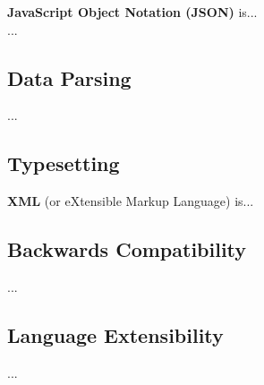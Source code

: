 \documentclass[../report.tex]{subfiles}
\begin{document}








\textbf{JavaScript Object Notation (JSON)} is... \\

...

\subsection{Data Parsing}

...

\subsection{Typesetting}

\textbf{XML} (or eXtensible Markup Language) is...

\subsection{Backwards Compatibility}

...

\subsection{Language Extensibility}

...
\end{document}
